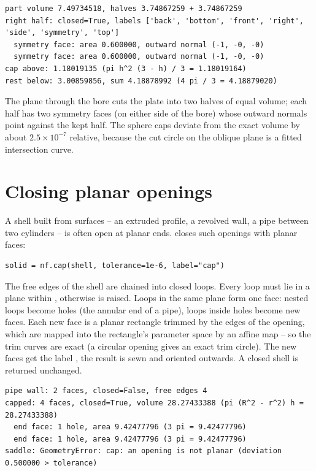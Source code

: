 
\begin{lstlisting}[style=text]
part volume 7.49734518, halves 3.74867259 + 3.74867259
right half: closed=True, labels ['back', 'bottom', 'front', 'right', 'side', 'symmetry', 'top']
  symmetry face: area 0.600000, outward normal (-1, -0, -0)
  symmetry face: area 0.600000, outward normal (-1, -0, -0)
cap above: 1.18019135 (pi h^2 (3 - h) / 3 = 1.18019164)
rest below: 3.00859856, sum 4.18878992 (4 pi / 3 = 4.18879020)
\end{lstlisting}

The plane through the bore cuts the plate into two halves of equal volume; each half has two
symmetry faces (on either side of the bore) whose outward normals point against the kept
half. The sphere caps deviate from the exact volume by about $2.5\times10^{-7}$ relative,
because the cut circle on the oblique plane is a fitted intersection curve.

\section{Closing planar openings}\label{sec:cap}

A shell built from surfaces -- an extruded profile, a revolved wall, a pipe between two
cylinders -- is often open at planar ends.  closes such openings with planar
faces:

\begin{lstlisting}
solid = nf.cap(shell, tolerance=1e-6, label="cap")
\end{lstlisting}

The free edges of the shell are chained into closed loops. Every loop must lie in a plane
within , otherwise  is raised. Loops in the same plane form
one face: nested loops become holes (the annular end of a pipe), loops inside holes become new
faces. Each new face is a planar rectangle trimmed by the edges of the opening, which are
mapped into the rectangle's parameter space by an affine map -- so the trim curves are exact
(a circular opening gives an exact trim circle). The new faces get the label , the
result is sewn and oriented outwards. A closed shell is returned unchanged.


\begin{lstlisting}[style=text]
pipe wall: 2 faces, closed=False, free edges 4
capped: 4 faces, closed=True, volume 28.27433388 (pi (R^2 - r^2) h = 28.27433388)
  end face: 1 hole, area 9.42477796 (3 pi = 9.42477796)
  end face: 1 hole, area 9.42477796 (3 pi = 9.42477796)
saddle: GeometryError: cap: an opening is not planar (deviation 0.500000 > tolerance)
\end{lstlisting}

